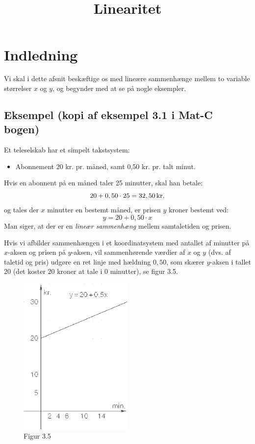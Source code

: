 \documentclass[12pt,oneside,a4paper]{article}
\title{Linearitet}
\begin{document}
\maketitle

\section{Indledning}
Vi skal i dette afsnit beskæftige os med lineære sammenhænge mellem to variable
størrelser $x$ og $y$, og begynder med at se på nogle eksempler.

\subsection{Eksempel (kopi af eksempel 3.1 i Mat-C bogen)}
Et teleselskab har et simpelt takstsystem:
\begin{itemize}
    \item Abonnement 20 kr. pr. måned, samt 0,50 kr. pr. talt minut.
\end{itemize}
Hvis en abonnent på en måned taler 25 minutter, skal han betale:
$$
20 + 0,50\cdot25 = 32,50 \, {\rm kr},
$$
og tales der $x$ minutter en bestemt måned, er prisen $y$ kroner bestemt ved:
$$
y = 20 + 0,50\cdot x
$$
Man siger, at der er en {\em lineær sammenhæng} mellem samtaletiden og prisen.

Hvis vi afbilder sammenhængen i et koordinatsystem med antallet af minutter på
$x$-aksen og prisen på $y$-aksen, vil sammenhørende værdier af $x$ og $y$ (dvs.
af taletid og pris) udgøre en ret linje med hældning $0,50$, som skærer
$y$-aksen i tallet $20$ (det koster 20 kroner at tale i 0 minutter), se figur
3.5.

\begin{figure}[ht]
    \centering
    \includegraphics[width=0.5\textwidth]{fig35}
    \caption{Figur 3.5}
    \label{fig35}
\end{figure}
\end{document}
